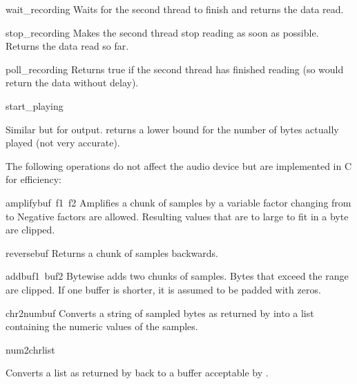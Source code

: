 \begin{funcdesc}{wait_recording}{}
Waits for the second thread to finish and returns the data read.
\end{funcdesc}

\begin{funcdesc}{stop_recording}{}
Makes the second thread stop reading as soon as possible.
Returns the data read so far.
\end{funcdesc}

\begin{funcdesc}{poll_recording}{}
Returns true if the second thread has finished reading (so
 would return the data without delay).
\end{funcdesc}

\begin{funcdesc}{start_playing}{}
\begin{sloppypar}
Similar but for output.
returns a lower bound for the number of bytes actually played (not very
accurate).
\end{sloppypar}
\end{funcdesc}

The following operations do not affect the audio device but are
implemented in C for efficiency:

\renewcommand{\indexsubitem}{(in module audio)}
\begin{funcdesc}{amplify}{buf\, f1\, f2}
Amplifies a chunk of samples by a variable factor changing from
 to 
Negative factors are allowed.
Resulting values that are to large to fit in a byte are clipped.         
\end{funcdesc}

\begin{funcdesc}{reverse}{buf}
Returns a chunk of samples backwards.
\end{funcdesc}

\begin{funcdesc}{add}{buf1\, buf2}
Bytewise adds two chunks of samples.
Bytes that exceed the range are clipped.
If one buffer is shorter, it is assumed to be padded with zeros.
\end{funcdesc}

\begin{funcdesc}{chr2num}{buf}
Converts a string of sampled bytes as returned by  into
a list containing the numeric values of the samples.
\end{funcdesc}

\begin{funcdesc}{num2chr}{list}
\begin{sloppypar}
Converts a list as returned by
back to a buffer acceptable by
.
\end{sloppypar}
\end{funcdesc}
